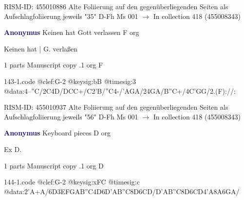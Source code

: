 \documentclass[twocolumn]{book}
\begin{document}
\newline RISM-ID: 455010886
\newline Alte Foliierung auf den gegenüberliegenden Seiten als Aufschlagfoliierung jeweils "35"
\newline D-Fh  Ms 001
\newline $\rightarrow$ In collection 418 (455008343)

\newline \par \vspace{7pt} \textcolor{darkblue}{\textbf{Anonymus  }}
\newline Keinen hat Gott verlassen  F  
\newline org
\newline \begin{itshape}[f.65v, at left:] Keinen hat | G. verlaßen\end{itshape} 
\newline \textcolor{darkblue}{}  1 parts  
\newline Manuscript copy
.1  org  F  
\begin{filecontents*}{143-1.code}
@clef:G-2
@keysig:bB
@timesig:3
@data:4--''C/2C4D/DCC+/C2'B/''C4-/'AGA/24GA/B''C+/4C'GG/2.(F)://:
\end{filecontents*}
\newline
%

\newline RISM-ID: 455010937
\newline Alte Foliierung auf den gegenüberliegenden Seiten als Aufschlagfoliierung jeweils "56"
\newline D-Fh  Ms 001
\newline $\rightarrow$ In collection 418 (455008343)

\newline \par \vspace{7pt} \textcolor{darkblue}{\textbf{Anonymus  }}
\newline Keyboard pieces  D  
\newline org
\newline \begin{itshape}[f.1r, at left:] Ex D.\end{itshape} 
\newline \textcolor{darkblue}{}  1 parts  
\newline Manuscript copy
.1  org  D  
\begin{filecontents*}{144-1.code}
@clef:G-2
@keysig:xFC
@timesig:c
@data:2'A+A/{6D3EF}{GAB''C}4D{6D'AB''C}{8D6CD}/{D'AB''C}{8D6CD}4'A{8A6GA}/
\end{filecontents*}
\newline
%
\end{document}
